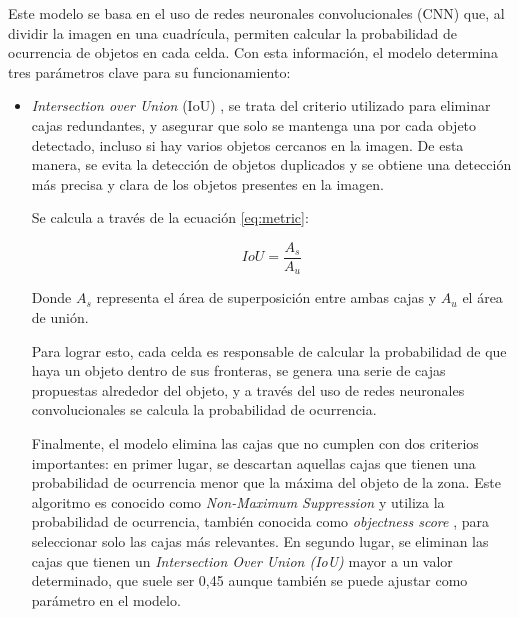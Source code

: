 Este modelo se basa en el uso de redes neuronales convolucionales (CNN) que, al dividir la imagen en una cuadrícula, permiten calcular la probabilidad de ocurrencia de objetos en cada celda. Con esta información, el modelo determina tres parámetros clave para su funcionamiento:

\begin{itemize}
	\item \textit{Intersection over Union} (IoU) \cite{8}, se trata del criterio utilizado para eliminar cajas redundantes, y asegurar que solo se mantenga una por cada objeto detectado, incluso si hay varios objetos cercanos en la imagen. De esta manera, se evita la detección de objetos duplicados y se obtiene una detección más precisa y clara de los objetos presentes en la imagen.
	
	Se calcula a través de la ecuación \ref{eq:metric}:
	
\begin{equation}
	\label{eq:metric}
	IoU=\frac{A_{s}}{A_{u}}
\end{equation}
	
	
	
	Donde $A_{s}$ representa el área de superposición entre ambas cajas y $A_{u}$ el área de unión.
	
	Para lograr esto, cada celda es responsable de calcular la probabilidad de que haya un objeto dentro de sus fronteras, se genera una serie de cajas propuestas alrededor del objeto, y a través del uso de redes neuronales convolucionales se calcula la probabilidad de ocurrencia.
	
	Finalmente, el modelo elimina las cajas que no cumplen con dos criterios importantes:	en primer lugar, se descartan aquellas cajas que tienen una probabilidad de ocurrencia menor que la máxima del objeto de la zona. Este algoritmo es conocido como \textit{Non-Maximum Suppression} \cite{14} y utiliza la probabilidad de ocurrencia, también conocida como \textit{objectness score} \cite{12}, para seleccionar solo las cajas más relevantes. En segundo lugar, se eliminan las cajas que tienen un \textit{Intersection Over Union (IoU)} mayor a un valor determinado, que suele ser 0,45 aunque también se puede ajustar como parámetro en el modelo.
	

\end{itemize}

